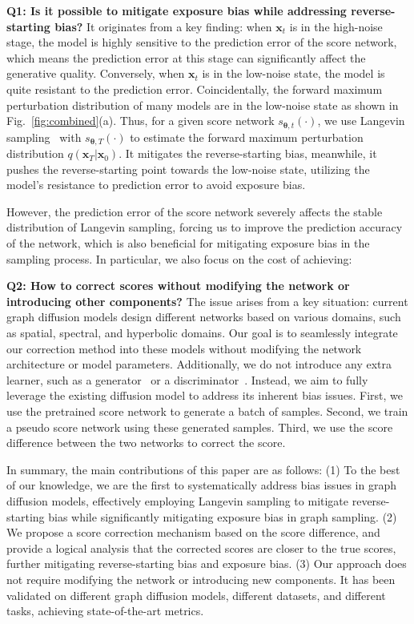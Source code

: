 \documentclass{article}
\newcommand{\x}{{{\bm x}}}
\newcommand{\THETA}{{\bm\theta}}
\begin{document}
\textbf{Q1: Is it possible to mitigate exposure bias while addressing reverse-starting bias?} It originates from a key finding: when $\x_t$ is in the high-noise stage, the model is highly sensitive to the prediction error of the score network, which means the prediction error at this stage can significantly affect the generative quality. Conversely, when $\x_t$ is in the low-noise state, the model is quite resistant to the prediction error. Coincidentally, the forward maximum perturbation distribution of many models are in the low-noise state as shown in Fig.~\ref{fig:combined}(a). Thus, for a given score network $s_{\THETA,t}(\cdot)$, we use Langevin sampling~\citep{song2019generative} with $s_{\THETA,T}(\cdot)$ to estimate the forward maximum perturbation distribution $q(\x_T|\x_0)$. It mitigates the reverse-starting bias, meanwhile, it pushes the reverse-starting point towards the low-noise state, utilizing the model's resistance to prediction error to avoid exposure bias.

However, the prediction error of the score network severely affects the stable distribution of Langevin sampling, forcing us to improve the prediction accuracy of the network, which is also beneficial for mitigating exposure bias in the sampling process. In particular, we also focus on the cost of achieving: 

\textbf{Q2: How to correct scores without modifying the network or introducing other components?} The issue arises from a key situation: current graph diffusion models design different networks based on various domains, such as spatial, spectral, and hyperbolic domains. Our goal is to seamlessly integrate our correction method into these models without modifying the network architecture or model parameters. Additionally, we do not introduce any extra learner, such as a generator~\citep{zheng2022truncated} or a discriminator~\citep{kim2023refining}. Instead, we aim to fully leverage the existing diffusion model to address its inherent bias issues. First, we use the pretrained score network to generate a batch of samples. Second, we train a pseudo score network using these generated samples. Third, we use the score difference between the two networks to correct the score.

In summary, the main contributions of this paper are as follows: (1) To the best of our knowledge, we are the first to systematically address bias issues in graph diffusion models, effectively employing Langevin sampling to mitigate reverse-starting bias while significantly mitigating exposure bias in graph sampling. (2) We propose a score correction mechanism based on the score difference, and provide a logical analysis that the corrected scores are closer to the true scores, further mitigating reverse-starting bias and exposure bias. (3) Our approach does not require modifying the network or introducing new components. It has been validated on different graph diffusion models, different datasets, and different tasks, achieving state-of-the-art metrics.
\end{document}
